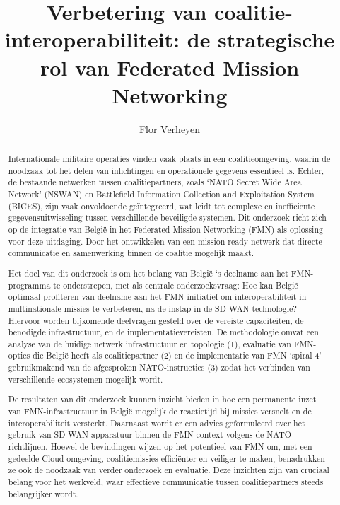 \documentclass{hogent-article}
\title{Verbetering van coalitie-interoperabiliteit: de strategische rol van Federated Mission Networking}
\author{Flor Verheyen}
\begin{document}
\begin{abstract}
Internationale militaire operaties vinden vaak plaats in een coalitieomgeving, waarin de noodzaak tot het delen van inlichtingen en operationele gegevens essentieel is. Echter, de bestaande netwerken tussen coalitiepartners, zoals ‘NATO Secret Wide Area Network’ (NSWAN) en Battlefield Information Collection and Exploitation System (BICES), zijn vaak onvoldoende geïntegreerd, wat leidt tot complexe en inefficiënte gegevensuitwisseling tussen verschillende beveiligde systemen. Dit onderzoek richt zich op de integratie van België in het Federated Mission Networking (FMN) als oplossing voor deze uitdaging. Door het ontwikkelen van een mission-ready netwerk dat directe communicatie en samenwerking binnen de coalitie mogelijk maakt.

Het doel van dit onderzoek is om het belang van België ‘s deelname aan het FMN-programma te onderstrepen, met als centrale onderzoeksvraag: Hoe kan België optimaal profiteren van deelname aan het FMN-initiatief om interoperabiliteit in multinationale missies te verbeteren, na de instap in de SD-WAN technologie? Hiervoor worden bijkomende deelvragen gesteld over de vereiste capaciteiten, de benodigde infrastructuur, en de implementatievereisten. De methodologie omvat een analyse van de huidige netwerk infrastructuur en topologie (1), evaluatie van FMN-opties die België heeft als coalitiepartner (2) en de implementatie van FMN ‘spiral 4’ gebruikmakend van de afgesproken NATO-instructies (3) zodat het verbinden van verschillende ecosystemen mogelijk wordt.

De resultaten van dit onderzoek kunnen inzicht bieden in hoe een permanente inzet van FMN-infrastructuur in België mogelijk de reactietijd bij missies versnelt en de interoperabiliteit versterkt. Daarnaast wordt er een advies geformuleerd over het gebruik van SD-WAN apparatuur binnen de FMN-context volgens de NATO-richtlijnen. Hoewel de bevindingen wijzen op het potentieel van FMN om, met een gedeelde Cloud-omgeving, coalitiemissies efficiënter en veiliger te maken, benadrukken ze ook de noodzaak van verder onderzoek en evaluatie. Deze inzichten zijn van cruciaal belang voor het werkveld, waar effectieve communicatie tussen coalitiepartners steeds belangrijker wordt.
\end{abstract}

\tableofcontents



\printbibliography[heading=bibintoc]
\end{document}
